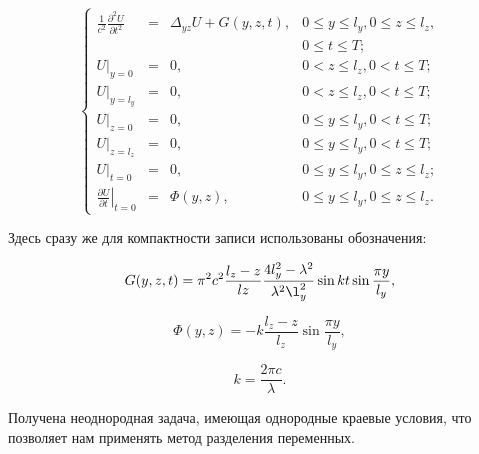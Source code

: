 \begin{equation}
  \label{eq:new_problem}
  \left\{
    \begin{array}{rclr}
      \frac{1}{c^2} \frac{\partial^2 U}{\partial t^2} & = & \Delta_{yz} U + G(y, z, t), & 0 \le y \le l_y, 0 \le z \le l_z, \\
      &&& 0 \le t \le T;\\
      \left. U \right|_{y=0} & = & 0, & 0 < z \le l_z, 0 < t \le T; \\
      \left. U \right|_{y=l_y} & = & 0, & 0 < z \le l_z, 0 < t \le T; \\ 
      \left. U \right|_{z=0} & = &  0, & 0 \le y \le l_y, 0 < t \le T; \\
      \left. U \right|_{z=l_z} &=& 0, & 0 \le y \le l_y, 0 < t \le T; \\
      \left. U \right|_{t=0} & = & 0, & 0 \le y \le l_y, 0 \le z \le l_z; \\
      \left. \frac{\partial U}{\partial t} \right|_{t=0} &=& \Phi(y, z), & 0 \le y \le l_y, 0 \le z \le l_z.
    \end{array}
  \right.
\end{equation}

Здесь сразу же для компактности записи использованы обозначения:

\begin{equation}
\label{eq:g}
G(y, z, t) = \pi^2 c^2\frac{l_z - z}{lz}\frac{4l_y^2 - \lambda^2}{\lambda^2 \l_y^2}\sin k t \sin\frac{\pi y}{l_y},
\end{equation}

\begin{equation}
\label{eq:phi}
\Phi(y, z) = -k\frac{l_z - z}{l_z}\sin\frac{\pi y}{l_y},
\end{equation}

\begin{equation}
\label{eq:k}
k = \frac{2 \pi c}{\lambda}.
\end{equation}

Получена неоднородная задача, имеющая однородные краевые условия, что
позволяет нам применять метод разделения переменных.
